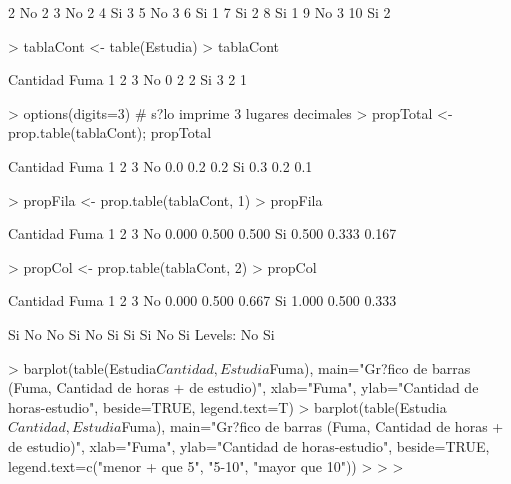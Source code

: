 \documentclass{article}
\begin{document}
\begin{Schunk}
\begin{Soutput}
2    No        2
3    No        2
4    Si        3
5    No        3
6    Si        1
7    Si        2
8    Si        1
9    No        3
10   Si        2
\end{Soutput}
\begin{Sinput}
> tablaCont <- table(Estudia)
> tablaCont
\end{Sinput}
\begin{Soutput}
    Cantidad
Fuma 1 2 3
  No 0 2 2
  Si 3 2 1
\end{Soutput}
\begin{Sinput}
> options(digits=3) # s?lo imprime 3 lugares decimales
> propTotal <- prop.table(tablaCont); propTotal
\end{Sinput}
\begin{Soutput}
    Cantidad
Fuma   1   2   3
  No 0.0 0.2 0.2
  Si 0.3 0.2 0.1
\end{Soutput}
\begin{Sinput}
> propFila <- prop.table(tablaCont, 1)
> propFila
\end{Sinput}
\begin{Soutput}
    Cantidad
Fuma     1     2     3
  No 0.000 0.500 0.500
  Si 0.500 0.333 0.167
\end{Soutput}
\begin{Sinput}
> propCol <- prop.table(tablaCont, 2)
> propCol
\end{Sinput}
\begin{Soutput}
    Cantidad
Fuma     1     2     3
  No 0.000 0.500 0.667
  Si 1.000 0.500 0.333
\end{Soutput}
\begin{Soutput}
 [1] Si No No Si No Si Si Si No Si
Levels: No Si
\end{Soutput}
\begin{Sinput}
> barplot(table(Estudia$Cantidad, Estudia$Fuma), main="Gr?fico de barras (Fuma, Cantidad de horas
+ de estudio)", xlab="Fuma", ylab="Cantidad de horas-estudio", beside=TRUE, legend.text=T)
> barplot(table(Estudia$Cantidad, Estudia$Fuma), main="Gr?fico de barras (Fuma, Cantidad de horas
+ de estudio)", xlab="Fuma", ylab="Cantidad de horas-estudio", beside=TRUE, legend.text=c("menor
+ que 5", "5-10", "mayor que 10"))
> 
> 
> 
\end{Sinput}
\end{Schunk}
\end{document}
